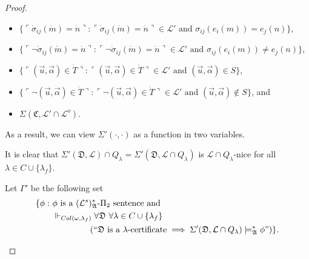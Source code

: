 \documentclass[12pt]{article}
\numberwithin{equation}{section}
\begin{document}
\begin{proof}
\begin{defi}
\begin{itemize}
    \item $\{\ulcorner \dot{\sigma}_{ij}(\dot{m}) = \dot{n} \urcorner : \ulcorner \dot{\sigma}_{ij}(\dot{m}) = \dot{n} \urcorner \in \mathcal{L}' \text{ and } \sigma_{ij}(e_i(m)) = e_j(n)\}$,
    \item $\{\ulcorner \neg \dot{\sigma}_{ij}(\dot{m}) = \dot{n} \urcorner : \ulcorner \neg \dot{\sigma}_{ij}(\dot{m}) = \dot{n} \urcorner \in \mathcal{L}' \text{ and } \sigma_{ij}(e_i(m)) \neq e_j(n)\}$,
    \item $\{\ulcorner (\Vec{u}, \Vec{\alpha}) \in \dot{T} \urcorner : \ulcorner (\Vec{u}, \Vec{\alpha}) \in \dot{T} \urcorner \in \mathcal{L}' \text{ and } (\Vec{u}, \Vec{\alpha}) \in S\}$,
    \item $\{\ulcorner \neg (\Vec{u}, \Vec{\alpha}) \in \dot{T} \urcorner : \ulcorner \neg (\Vec{u}, \Vec{\alpha}) \in \dot{T} \urcorner \in \mathcal{L}' \text{ and } (\Vec{u}, \Vec{\alpha}) \not\in S\}$, and
    \item $\Sigma(\mathfrak{C}, \mathcal{L}' \cap \mathcal{L}^o)$.
\end{itemize}
As a result, we can view $\Sigma'(\cdot, \cdot)$ as a function in two variables.
\end{defi}

It is clear that $\Sigma'(\mathfrak{D}, \mathcal{L}) \cap Q_{\lambda} = \Sigma'(\mathfrak{D}, \mathcal{L} \cap Q_{\lambda})$ is $\mathcal{L} \cap Q_{\lambda}$-nice for all $\lambda \in C \cup \{\lambda_f\}$.

\begin{defi}
Let $\Gamma'$ be the following set
\begin{align*}
    \{\phi : \ & \phi \text{ is a } (\mathcal{L}^s)^*_{\mathfrak{A}}\text{-}\Pi_2 \text{ sentence and} \\
    & \Vdash_{Col(\omega, \lambda_f)} \forall \mathfrak{D} \ \forall \lambda \in C \cup \{\lambda_f\} \\
    & \mspace{80mu} (``\mathfrak{D} \text{ is a } \lambda \text{-certificate} \implies \Sigma'(\mathfrak{D}, \mathcal{L} \cap Q_{\lambda}) \models^*_{\mathfrak{A}} \phi")\} \text{.}
\end{align*}
\end{defi}


\end{proof}
\end{document}
